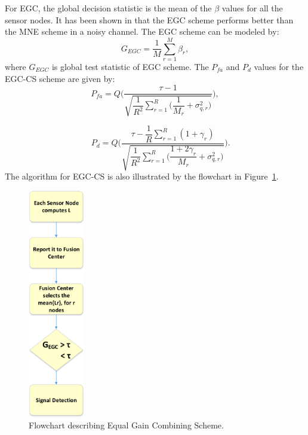 For EGC, the global decision statistic is the mean of the $\beta$ values for all the sensor nodes. It has been shown in \cite{inhtn12} that the EGC scheme performs better than the MNE scheme in a noisy channel. The EGC scheme can be modeled by:
\begin{equation}
	\label{eq:11}
	 G_{EGC} = \dfrac{1}{M}\sum_{r=1}^{M}{\beta_r},
\end{equation}
where $G_{EGC}$ is global test statistic of EGC scheme. The $P_{fa}$ and $P_d$ values for the EGC-CS scheme are given by:
\begin{equation}
\label{eq:12}
P_{fa} = Q\Bigg(\dfrac{\tau-1}{\sqrt{\dfrac{1}{R^2}\sum_{r=1}^{R}\bigg(\dfrac{1}{M_r}+\sigma_{q,r}^2\bigg)}}\Bigg),
\end{equation}

\begin{equation}
\label{eq:13}
~~~~~~P_d = Q\Bigg(\dfrac{\tau-\dfrac{1}{R}\sum_{r=1}^R(1+\gamma_r)}{\sqrt{\dfrac{1}{R^2}\sum_{r=1}^{R}\bigg(\dfrac{1+2\gamma_r}{M_r}+\sigma_{q,r}^2\bigg)}}\Bigg).
\end{equation}
The algorithm for EGC-CS is also illustrated by the flowchart in Figure~\ref{egcscheme}.

\begin{figure}[ht!]
	\centering
	\includegraphics[width=\textwidth,height=10cm,keepaspectratio]{images/Gill/figs/egcscheme.eps}
\caption{Flowchart describing Equal Gain Combining Scheme.} 
\label{egcscheme}      
\end{figure}

